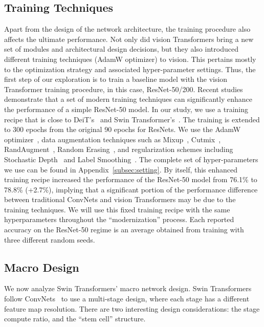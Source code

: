 \subsection{Training Techniques}
Apart from the design of the network architecture, the training procedure also affects the ultimate performance. 
Not only did vision Transformers bring a new set of modules and architectural design decisions, but they also introduced different training techniques (\eg AdamW optimizer) to vision.
This pertains mostly to the optimization strategy and associated hyper-parameter settings.
Thus, the first step of our exploration is to train a baseline model with the vision Transformer training procedure, in this case, ResNet-50/200. 
Recent studies~\cite{bello2021revisiting, Wightman2021resnet} demonstrate that a set of modern training techniques can significantly enhance the performance of a simple ResNet-50 model. In our study, we use a training recipe that is close to DeiT's~\cite{Touvron2020} and Swin Transformer's~\cite{Liu2021swin}. The training is extended to 300 epochs from the original 90 epochs for ResNets. We use the AdamW optimizer~\cite{Loshchilov2019}, data augmentation techniques such as Mixup~\cite{Zhang2018a}, Cutmix~\cite{Yun2019}, RandAugment~\cite{Cubuk2020}, Random Erasing~\cite{Zhong2020}, and regularization schemes including Stochastic Depth~\cite{Huang2017} and Label Smoothing~\cite{Szegedy2016a}. The complete set of hyper-parameters we use can be found in Appendix~\ref{subsec:setting}. By itself, this enhanced training recipe increased the performance of the ResNet-50 model from 76.1\% \cite{torchvision} to 78.8\% (+2.7\%), implying that a significant portion of the performance difference between traditional ConvNets and vision Transformers may be due to the training techniques. We will use this fixed training recipe with the same hyperparameters throughout the ``modernization'' process. Each reported accuracy on the ResNet-50 regime is an average obtained from training with three different random seeds.

\subsection{Macro Design}
We now analyze Swin Transformers' macro network design. Swin Transformers follow ConvNets~\cite{vgg, resnet} to use a multi-stage design, where each stage has a different feature map resolution. There are two interesting design considerations: the stage compute ratio, and the ``stem cell'' structure.
